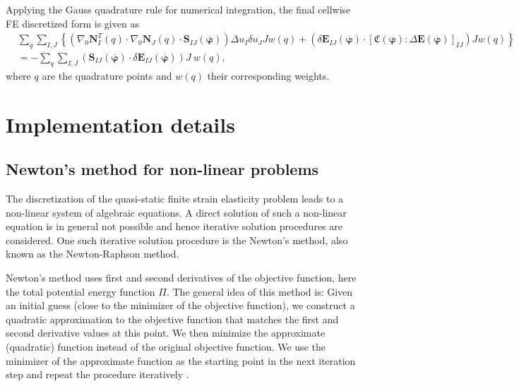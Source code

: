 Applying the Gauss quadrature rule for numerical integration, the final cellwise FE discretized form is given as
\begin{align}
&\sum\limits_q \sum\limits_{I,J} \left\lbrace \left(\nabla_0 \mathbf{N}^T_I(q) \cdot \nabla_0 \mathbf{N}_J(q) \cdot \mathbf{S}_{IJ}(\overline{\bm{\varphi}}) \right) \Delta u_I \delta u_J J w(q) + \left( \delta \mathbf{E}_{IJ}(\overline{\bm{\varphi}}) \cdot \left[ \mathfrak{C}(\overline{\bm{\varphi}}) : \Delta \mathbf{E}(\overline{\bm{\varphi}}) \right]_{IJ} \right) J w(q) \right\rbrace \nonumber \\
&= -\sum\limits_q \sum\limits_{I,J} \left( \mathbf{S}_{IJ}(\overline{\bm{\varphi}}) \cdot \delta \mathbf{E}_{IJ}(\overline{\bm{\varphi}}) \right) J \ w(q),
\end{align}
where $q$ are the quadrature points and $w(q)$ their corresponding weights.  

\section{Implementation details}
\subsection{Newton's method for non-linear problems}
The discretization of the quasi-static finite strain elasticity problem leads to a non-linear system of algebraic equations. A direct solution of such a non-linear equation is in general not possible and hence iterative solution procedures are considered. One such iterative solution procedure is the Newton's method, also known as the Newton-Raphson method. \par 

Newton's method uses first and second derivatives of the objective function, here the total potential energy function $\Pi$. The general idea of this method is: Given an initial guess (close to the minimizer of the objective function), we construct a quadratic approximation to the objective function that matches the first and second derivative values at this point. We then minimize the approximate (quadratic) function instead of the original objective function. We use the minimizer of the approximate function as the starting point in the next iteration step and repeat the procedure iteratively \cite{EdwinK.P.Chong2013}. \par

